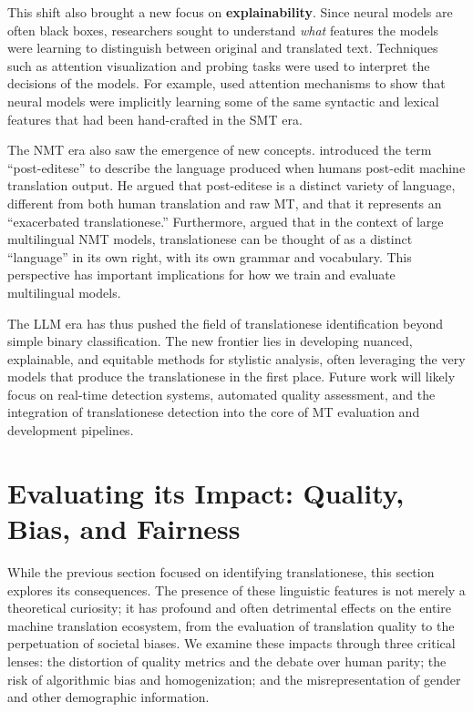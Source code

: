 \documentclass[11pt,a4paper]{article}
\begin{document}
This shift also brought a new focus on \textbf{explainability}. Since neural models are often black boxes, researchers sought to understand \textit{what} features the models were learning to distinguish between original and translated text. Techniques such as attention visualization and probing tasks were used to interpret the decisions of the models. For example, \citet{amponsah2022explaining} used attention mechanisms to show that neural models were implicitly learning some of the same syntactic and lexical features that had been hand-crafted in the SMT era.

The NMT era also saw the emergence of new concepts. \citet{toral2019post} introduced the term ``post-editese'' to describe the language produced when humans post-edit machine translation output. He argued that post-editese is a distinct variety of language, different from both human translation and raw MT, and that it represents an ``exacerbated translationese.'' Furthermore, \citet{riley2020translationese} argued that in the context of large multilingual NMT models, translationese can be thought of as a distinct ``language'' in its own right, with its own grammar and vocabulary. This perspective has important implications for how we train and evaluate multilingual models.

The LLM era has thus pushed the field of translationese identification beyond simple binary classification. The new frontier lies in developing nuanced, explainable, and equitable methods for stylistic analysis, often leveraging the very models that produce the translationese in the first place. Future work will likely focus on real-time detection systems, automated quality assessment, and the integration of translationese detection into the core of MT evaluation and development pipelines.

\section{Evaluating its Impact: Quality, Bias, and Fairness}

While the previous section focused on identifying translationese, this section explores its consequences. The presence of these linguistic features is not merely a theoretical curiosity; it has profound and often detrimental effects on the entire machine translation ecosystem, from the evaluation of translation quality to the perpetuation of societal biases. We examine these impacts through three critical lenses: the distortion of quality metrics and the debate over human parity; the risk of algorithmic bias and homogenization; and the misrepresentation of gender and other demographic information.
\end{document}
